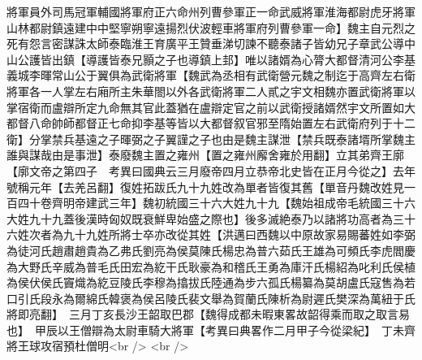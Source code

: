 將軍員外司馬冠軍輔國將軍府正六命州列曹參軍正一命武威將軍淮海都尉虎牙將軍山林都尉鎮遠建中中堅寧朔寧遠揚烈伏波輕車將軍府列曹參軍一命】魏主自元烈之死有怨言密謀誅太師泰臨淮王育廣平王贊垂涕切諫不聽泰諸子皆幼兄子章武公導中山公護皆出鎮【導護皆泰兄顥之子也導鎮上邽】唯以諸婿為心膂大都督清河公李基義城李暉常山公于翼俱為武衛將軍【魏武為丞相有武衛營元魏之制迄于高齊左右衛將軍各一人掌左右廂所主朱華閤以外各武衛將軍二人貳之宇文相魏亦置武衛將軍以掌宿衛而盧辯所定九命無其官此蓋猶在盧辯定官之前以武衛授諸婿然宇文所置如大都督八命帥師都督正七命抑李基等皆以大都督叙官邪至隋始置左右武衛府列于十二衛】分掌禁兵基遠之子暉弼之子翼謹之子也由是魏主謀泄【禁兵既泰諸壻所掌魏主誰與謀哉由是事泄】泰廢魏主置之雍州【置之雍州廨舍雍於用翻】立其弟齊王廓【廓文帝之第四子　考異曰國典云三月廢帝四月立恭帝北史皆在正月今從之】去年號稱元年【去羌呂翻】復姓拓跋氏九十九姓改為單者皆復其舊【單音丹魏改姓見一百四十卷齊明帝建武三年】魏初統國三十六大姓九十九【魏始祖成帝毛統國三十六大姓九十九蓋後漢時匈奴既衰鮮卑始盛之際也】後多滅絶泰乃以諸將功高者為三十六姓次者為九十九姓所將士卒亦改從其姓【洪邁曰西魏以中原故家易賜蕃姓如李弼為徒河氏趙肅趙貴為乙弗氏劉亮為侯莫陳氏楊忠為普六茹氏王雄為可頻氏李虎閻慶為大野氏辛威為普毛氏田宏為紇干氏耿豪為和稽氏王勇為庫汗氏楊紹為叱利氏侯植為侯伏侯氏竇熾為紇豆陵氏李穆為㩉拔氏陸通為步六孤氏楊纂為莫胡盧氏寇售為若口引氏段永為爾綿氏韓褒為侯呂陵氏裴文舉為賀蘭氏陳析為尉遲氏樊深為萬紐于氏將即亮翻】　三月丁亥長沙王韶取巴郡【魏得成都未暇東畧故韶得乘而取之取言易也】　甲辰以王僧辯為太尉車騎大將軍【考異曰典畧作二月甲子今從梁紀】　丁未齊將王球攻宿預杜僧明<br />
<br />
